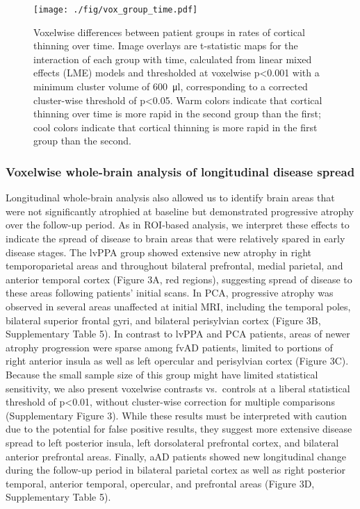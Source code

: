 \documentclass[]{article}
\begin{document}
\begin{figure}[]

{\centering \texttt{[image: ./fig/vox\_group\_time.pdf]} 

}

\caption[GM group x time differences]{Voxelwise differences between patient groups in rates of cortical thinning over time. Image overlays are t-statistic maps for the interaction of each group with time, calculated from linear mixed effects (LME) models and thresholded at voxelwise p<0.001 with a minimum cluster volume of \SI{600}{\micro\litre}, corresponding to a corrected cluster-wise threshold of p<0.05. Warm colors indicate that cortical thinning over time is more rapid in the second group than the first; cool colors indicate that cortical thinning is more rapid in the first group than the second. \label{gm_group_time}}

\end{figure}

\subsubsection*{Voxelwise whole-brain analysis of longitudinal disease
spread}\label{voxelwise-whole-brain-analysis-of-longitudinal-disease-spread}

Longitudinal whole-brain analysis also allowed us to identify brain
areas that were not significantly atrophied at baseline but demonstrated
progressive atrophy over the follow-up period. As in ROI-based analysis,
we interpret these effects to indicate the spread of disease to brain
areas that were relatively spared in early disease stages. The lvPPA
group showed extensive new atrophy in right temporoparietal areas and
throughout bilateral prefrontal, medial parietal, and anterior temporal
cortex (Figure 3A, red regions), suggesting spread of disease to these
areas following patients' initial scans. In PCA, progressive atrophy was
observed in several areas unaffected at initial MRI, including the
temporal poles, bilateral superior frontal gyri, and bilateral
perisylvian cortex (Figure 3B, Supplementary Table 5). In contrast to
lvPPA and PCA patients, areas of newer atrophy progression were sparse
among fvAD patients, limited to portions of right anterior insula as
well as left opercular and perisylvian cortex (Figure 3C). Because the
small sample size of this group might have limited statistical
sensitivity, we also present voxelwise contrasts vs.~controls at a
liberal statistical threshold of p\textless{}0.01, without cluster-wise
correction for multiple comparisons (Supplementary Figure 3). While
these results must be interpreted with caution due to the potential for
false positive results, they suggest more extensive disease spread to
left posterior insula, left dorsolateral prefrontal cortex, and
bilateral anterior prefrontal areas. Finally, aAD patients showed new
longitudinal change during the follow-up period in bilateral parietal
cortex as well as right posterior temporal, anterior temporal,
opercular, and prefrontal areas (Figure 3D, Supplementary Table 5).
\end{document}
